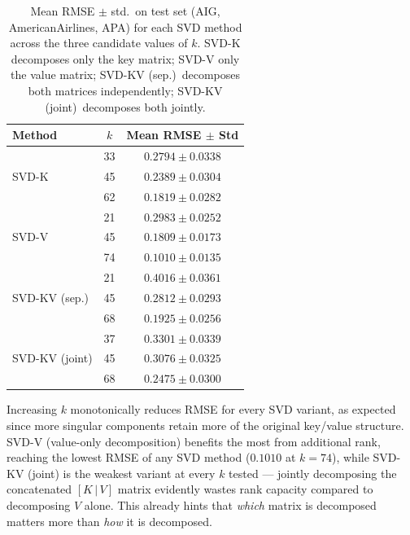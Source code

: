
\begin{table}[ht]
\centering
\caption{Mean RMSE $\pm$ std.\ on test set (AIG, AmericanAirlines, APA) for each SVD
method across the three candidate values of $k$. SVD-K decomposes only the key matrix;
SVD-V only the value matrix; SVD-KV (sep.)\ decomposes both matrices independently;
SVD-KV (joint)\ decomposes both jointly.}
\label{tab:svd_k_sweep}
\begin{tabular}{l c c}
\toprule
Method & $k$ & Mean RMSE $\pm$ Std \\
\midrule
\multirow{3}{*}{SVD-K}
  & 33 & $0.2794 \pm 0.0338$ \\
  & 45 & $0.2389 \pm 0.0304$ \\
  & 62 & $\mathbf{0.1819 \pm 0.0282}$ \\
\midrule
\multirow{3}{*}{SVD-V}
  & 21 & $0.2983 \pm 0.0252$ \\
  & 45 & $0.1809 \pm 0.0173$ \\
  & 74 & $\mathbf{0.1010 \pm 0.0135}$ \\
\midrule
\multirow{3}{*}{SVD-KV (sep.)}
  & 21 & $0.4016 \pm 0.0361$ \\
  & 45 & $0.2812 \pm 0.0293$ \\
  & 68 & $\mathbf{0.1925 \pm 0.0256}$ \\
\midrule
\multirow{3}{*}{SVD-KV (joint)}
  & 37 & $0.3301 \pm 0.0339$ \\
  & 45 & $0.3076 \pm 0.0325$ \\
  & 68 & $\mathbf{0.2475 \pm 0.0300}$ \\
\bottomrule
\end{tabular}
\end{table}

\noindent Increasing $k$ monotonically reduces RMSE for every SVD variant, as expected since
more singular components retain more of the original key/value structure. SVD-V (value-only
decomposition) benefits the most from additional rank, reaching the lowest RMSE of any SVD
method ($0.1010$ at $k=74$), while SVD-KV (joint) is the weakest variant at every $k$ tested ---
jointly decomposing the concatenated $[K\,|\,V]$ matrix evidently wastes rank capacity compared
to decomposing $V$ alone. This already hints that \emph{which} matrix is decomposed matters more
than \emph{how} it is decomposed.


